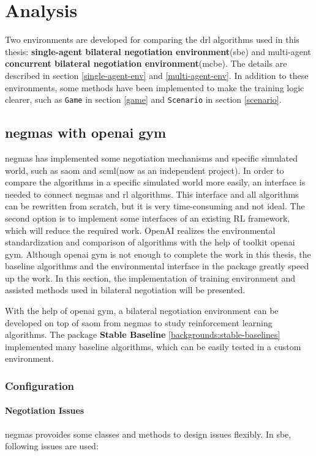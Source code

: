 \chapter{Analysis}
Two environments are developed for comparing the \gls{drl} algorithms used in this thesis: \textbf{single-agent bilateral negotiation environment}(\gls{sbe}) and multi-agent \textbf{concurrent bilateral negotiation environment}(\gls{mcbe}). The details are described in section \ref{single-agent-env} and \ref{multi-agent-env}. In addition to these environments, some methods have been implemented to make the training logic clearer, such as \texttt{Game} in section \ref{game} and \texttt{Scenario} in section \ref{scenario}.

\section{\gls{negmas} with \gls{openai gym}}
\gls{negmas} has implemented some negotiation mechanisms and specific simulated world, such as \gls{saom} and \gls{scml}(now as an independent project). In order to compare the algorithms in a specific simulated world more easily, an interface is needed to connect \gls{negmas} and \gls{rl} algorithms. This interface and all algorithms can be rewritten from scratch, but it is very time-consuming and not ideal. The second option is to implement some interfaces of an existing RL framework, which will reduce the required work. OpenAI realizes the environmental standardization and comparison of algorithms with the help of toolkit \gls{openai gym}\parencite{brockman2016openai}. Although \gls{openai gym} is not enough to complete the work in this thesis, the baseline algorithms and the environmental interface in the package greatly speed up the work. In this section, the implementation of training environment and assisted methods used in bilateral negotiation will be presented.

With the help of \gls{openai gym}, a bilateral negotiation environment can be developed on top of \gls{saom} from \gls{negmas} to study reinforcement learning algorithms. The package \textbf{Stable Baseline} \ref{backgrounds:stable-baselines} implemented many baseline algorithms, which can be easily tested in a custom environment.

\subsection{Configuration}
\subsubsection{Negotiation Issues}
\gls{negmas} provoides some classes and methods to design issues flexibly. In \gls{sbe}, following issues are used:
 
